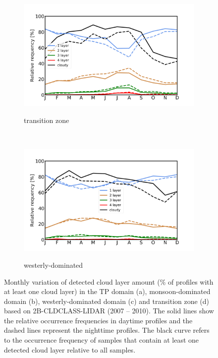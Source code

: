 \documentclass[alpha-refs]{wiley-article}
\begin{document}
\begin{figure}[!htbp]
    \begin{subfigure}[b]{0.5\textwidth}
        \centering
        \caption{transition zone }        
        \includegraphics[width=\textwidth]{monthly_cld_layer_transition_region.png}
\label{fig:seasonal_cld_lyr3}
    \end{subfigure}%
    ~ 
    \begin{subfigure}[b]{0.5\textwidth}
        \centering
        \caption{westerly-dominated }        
        \includegraphics[width=\textwidth]{monthly_cld_layer_westerly_region.png}
        \label{fig:seasonal_cld_lyr4}
    \end{subfigure}  
\caption{Monthly variation of detected cloud layer amount (\% of profiles with at least one cloud layer) in the TP domain (a), monsoon-dominated domain (b), westerly-dominated domain (c) and transition zone (d) based on 2B-CLDCLASS-LIDAR (2007 -- 2010). The solid lines show the relative occurrence frequencies in daytime profiles and the dashed lines represent the nighttime profiles. The black curve refers to the occurrence frequency of samples that contain at least one detected cloud layer relative to all samples.}
\label{fig:seasonal_cld_lyr}
\end{figure}
\end{document}
